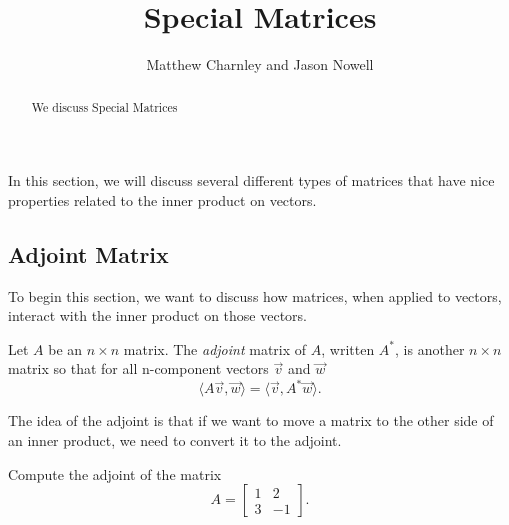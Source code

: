 \documentclass{ximera}
\title{Special Matrices}
\author{Matthew Charnley and Jason Nowell}
\begin{document}
\begin{abstract}
    We discuss Special Matrices
\end{abstract}
\maketitle

\label{specmat:section}



In this section, we will discuss several different types of matrices that have nice properties related to the inner product on vectors. 

\subsection{Adjoint Matrix}

To begin this section, we want to discuss how matrices, when applied to vectors, interact with the inner product on those vectors. 

\begin{definition}
    Let $A$ be an $n \times n$ matrix. The \emph{adjoint} matrix of $A$, written $A^*$, is another $n \times n$ matrix so that for all n-component vectors $\vec{v}$ and $\vec{w}$
    \[ 
        \langle A\vec{v} , \vec{w} \rangle = \langle \vec{v}, A^*\vec{w} \rangle.
    \]
\end{definition}

The idea of the adjoint is that if we want to move a matrix to the other side of an inner product, we need to convert it to the adjoint. 

\begin{example}
    Compute the adjoint of the matrix
    \[ 
        A = 
        \begin{bmatrix} 
            1 & 2 \\ 
            3 & -1 
        \end{bmatrix}. 
    \]
\end{example}
\end{document}
